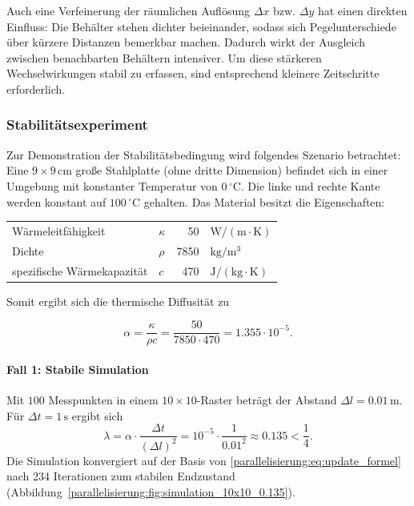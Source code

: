Auch eine Verfeinerung der räumlichen Auflösung \(\Delta x \) bzw. \(\Delta y\) hat einen direkten Einfluss: Die Behälter stehen dichter beieinander, sodass sich Pegelunterschiede über kürzere Distanzen bemerkbar machen. Dadurch wirkt der Ausgleich zwischen benachbarten Behältern intensiver. Um diese stärkeren Wechselwirkungen stabil zu erfassen, sind entsprechend kleinere Zeitschritte erforderlich.

\subsubsection{Stabilitätsexperiment}

Zur Demonstration der Stabilitätsbedingung wird folgendes Szenario betrachtet:
Eine \(9 \times 9 \, \mathrm{cm}\) große Stahlplatte (ohne dritte Dimension) befindet sich in einer Umgebung mit konstanter Temperatur von \(0\,^{\circ}\mathrm{C}\).  
Die linke und rechte Kante werden konstant auf \(100\,^{\circ}\mathrm{C}\) gehalten.  
Das Material besitzt die Eigenschaften:
\begin{center}
	\begin{tabular}{llrl}
		Wärmeleitfähigkeit & \(\kappa\) & 50 &
		\(\mathrm{W/(m \cdot K)}\) \\
		Dichte & \(\rho\)   &  7850 & \(\mathrm{kg/m^3}\) \\
		spezifische Wärmekapazität & \(c\) &  470 & \(\mathrm{J/(kg \cdot K)}\)
	\end{tabular}
\end{center}
Somit ergibt sich die thermische Diffusität zu


\[
\alpha =
\frac{\kappa}{\rho c}
=
\frac{50}{7850 \cdot 470}
= 1.355 \cdot 10^{-5}.
\]

\paragraph{Fall 1: Stabile Simulation}  
Mit \(100\) Messpunkten in einem \(10\times 10\)-Raster beträgt der Abstand \(\Delta l = 0.01\,\mathrm{m}\).  
Für \(\Delta t = 1\,\mathrm{s}\) ergibt sich
\[
\lambda =
\alpha \cdot \frac{\Delta t}{(\Delta l)^2}
=
10^{-5} \cdot \frac{1}{0.01^2}
\approx 0.135 < \frac14.
\]
Die Simulation konvergiert auf der Basis von \eqref{parallelisierung:eq:update_formel} nach 234 Iterationen zum stabilen Endzustand (Abbildung~\ref{parallelisierung:fig:simulation_10x10_0.135}).

